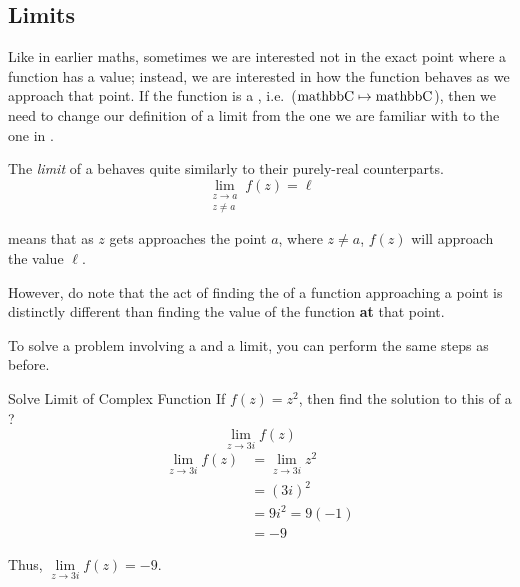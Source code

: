 \subsection{Limits}\label{subsec:Limits}
Like in earlier maths, sometimes we are interested not in the exact point where a function has a value; instead, we are interested in how the function behaves as we approach that point.
If the function is a , i.e.\ ($\operatorname{mathbb{C}} \mapsto \operatorname{mathbb{C}}$), then we need to change our definition of a limit from the one we are familiar with to the one in .

\begin{definition}[Limit]\label{def:Complex_Limit}
  The \emph{limit} of a  behaves quite similarly to their purely-real counterparts.
  \begin{equation}\label{eq:Complex_Limit}
    \lim\limits_{\substack{z \to a \\ z \neq a}} f(z) = \ell
  \end{equation}

   means that as $z$ gets approaches the point $a$, where $z \neq a$, $f(z)$ will approach the value $\ell$.

  \begin{remark}\label{rmk:Solving_Limit_Function}
    However, do note that the act of finding the  of a function approaching a point is distinctly different than finding the value of the function \textbf{at} that point.
  \end{remark}
\end{definition}

To solve a problem involving a  and a limit, you can perform the same steps as before.

\begin{example}[Lecture 5]{Solve Limit of Complex Function}
  If $f(z) = z^{2}$, then find the solution to this  of a ?
  \begin{equation*}
    \lim\limits_{z \to 3i} f(z)
  \end{equation*}
  \tcblower{}
  \begin{align*}
    \lim\limits_{z \to 3i} f(z) &= \lim\limits_{z \to 3i} z^{2} \\
                                &= {(3i)}^{2} \\
                                &= 9 i^{2} = 9 (-1) \\
                                &= -9
  \end{align*}

  Thus, $\lim\limits_{z \to 3i} f(z) = -9$.
\end{example}

